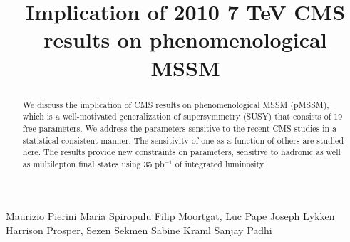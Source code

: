 \documentclass{cmspaper}
\begin{document}
%
\begin{titlepage}
\title{Implication of 2010 7 TeV CMS results on phenomenological MSSM}

  \begin{Authlist}
    Maurizio Pierini
    Maria Spiropulu
    Filip Moortgat, Luc Pape
    Joseph Lykken
    Harrison Prosper, Sezen Sekmen
    Sabine Kraml
    Sanjay Padhi
    
  \end{Authlist}

\begin{abstract}
We discuss the implication of CMS results on phenomenological MSSM (pMSSM), which is a well-motivated generalization of supersymmetry (SUSY) that consists of 19 free parameters.  We address the parameters sensitive 
to the recent CMS studies in a statistical consistent manner. The sensitivity of one as a function 
of others are studied here. The results provide new constraints on parameters, sensitive to hadronic as well as 
multilepton final states using 35 pb$^{-1}$ of integrated luminosity.
\end{abstract}
\end{titlepage}










\clearpage

\end{document}
